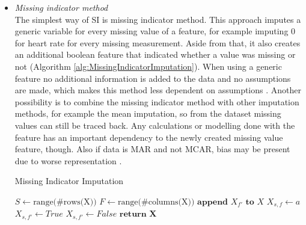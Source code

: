 \documentclass[10pt,a4paper]{report}
\begin{document}
	
	\begin{itemize}
		\item \textit{Missing indicator method} \\
		The simplest way of SI is missing indicator method. This approach imputes a generic variable for every missing value of a feature, for example imputing $0$ for heart rate for every missing measurement. Aside from that, it also creates an additional boolean feature that indicated whether a value was missing or not (Algorithm \ref{alg:MissingIndicatorImputation}). When using a generic feature no additional information is added to the data and no assumptions are made, which makes this method less dependent on assumptions \cite{pedersen2017missing}. Another possibility is to combine the missing indicator method with other imputation methods, for example the mean imputation, so from the dataset missing values can still be traced back. Any calculations or modelling done with the feature has an important dependency to the newly created missing value feature, though. Also if data is MAR and not MCAR, bias may be present due to worse representation \cite{donders2006gentle}.	
		
		\begin{algorithm}[H]
			\caption{Missing Indicator Imputation}\label{alg:MissingIndicatorImputation}
			\begin{algorithmic}[1]
				\State $S \gets \text{range(\#rows(X))}$ 	
				\State $F \gets \text{range(\#columns(X))}$ 	
				 					
				 				 			
				\State $\textbf{append } X_{f'} \textbf{ to } X$	
				 
				 				 
				\State $X_{s,f} \gets a$	
				\State $X_{s,f'} \gets True$	
				\Else
				\State $X_{s,f'} \gets False$ 
				\EndIf
				\EndFor
				\EndIf
				\EndFor
				\State $\textbf{return X}$
				\EndProcedure
			\end{algorithmic}
		\end{algorithm}
		

\end{itemize}
\end{document}
